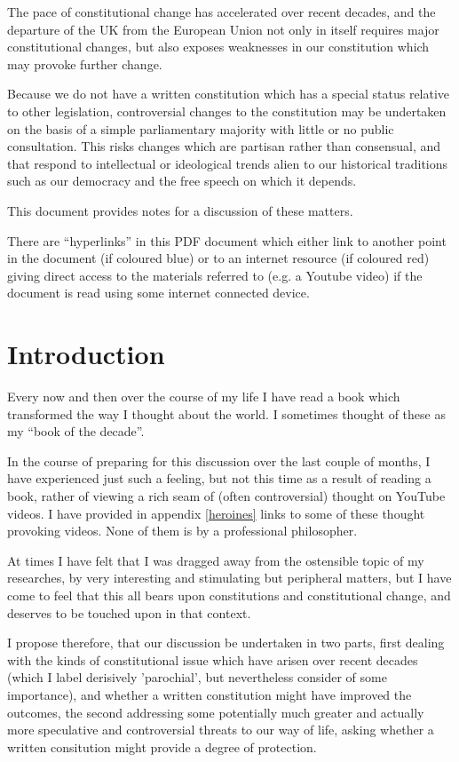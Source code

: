 \documentclass[14pt,titlepage]{extarticle}
\begin{document}

The pace of constitutional change has accelerated over recent decades,
and the departure of the UK from the European Union not only in itself
requires major constitutional changes, but also exposes weaknesses in
our constitution which may provoke further change.
 
Because we do not have a written constitution which has a special status
relative to other legislation, controversial changes to the constitution
may be undertaken on the basis of a simple parliamentary majority with little
or no public consultation.
This risks changes which are partisan rather than consensual, and that respond
to intellectual or ideological trends alien to our historical traditions such as
our democracy and the free speech on which it depends.
 
This document provides notes for a discussion of these matters.

There are ``hyperlinks'' in this PDF document which either link to another point in the document  (if coloured blue) or to an internet resource  (if coloured red) giving direct access to the materials referred to (e.g. a Youtube video) if the document is read using some internet connected device.

\section{Introduction}

Every now and then over the course of my life I have read a book which transformed the way I thought about the world.
I sometimes thought of these as my ``book of the decade''.

In the course of preparing for this discussion over the last couple of months, I have experienced just such a feeling, but not this time as a result of reading a book, rather of viewing a rich seam of (often controversial) thought on YouTube videos.
I have provided in appendix \ref{heroines} links to some of these thought provoking videos.
None of them is by a professional philosopher.

At times I have felt that I was dragged away from the ostensible topic of my researches, by very interesting and stimulating but peripheral matters, but I have come to feel that this all bears upon constitutions and constitutional change, and deserves to be touched upon in that context.

I propose therefore, that our discussion be undertaken in two parts, first dealing with the kinds of constitutional issue which have arisen over recent decades (which I label derisively 'parochial', but nevertheless consider of some importance), and whether a written constitution might have improved the outcomes, the second addressing some potentially much greater and actually more speculative and controversial threats to our way of life, asking whether a written consitution might provide a degree of protection.
\end{document}

